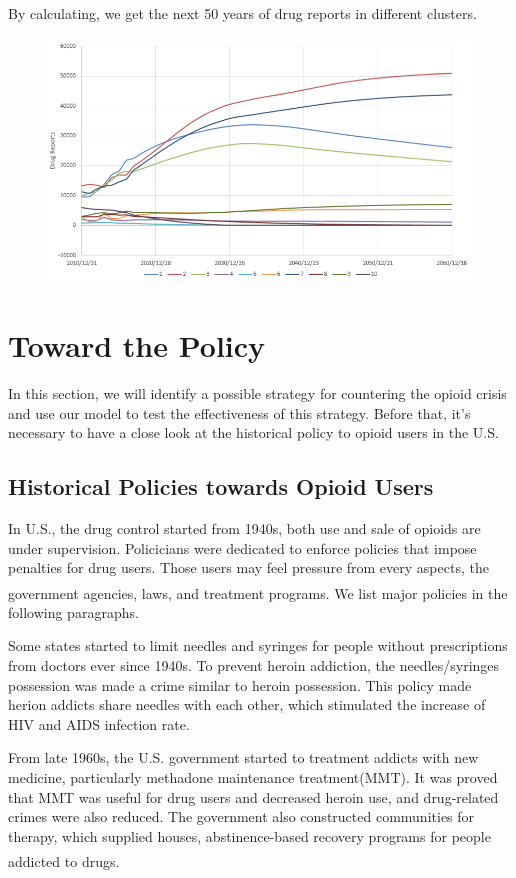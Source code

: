 \documentclass[12pt]{article}
\newcommand{\upcite}[1]{\textsuperscript{\textsuperscript{\cite{#1}}}}
\begin{document}
By calculating, we get the next 50 years of drug reports in different clusters. 
\begin{figure}[H]
	\centering
	\includegraphics[scale=0.8]{./figures/12.png}
	\caption{}
	\label{Fig12}
\end{figure}

\section{Toward the Policy}
In this section, we will identify a possible strategy for countering the opioid crisis and use our model to test the effectiveness of this strategy. Before that, it’s necessary to have a close look at the historical policy to opioid users in the U.S.

\subsection{Historical Policies towards Opioid Users} %
In U.S., the drug control started from 1940s, both use and sale of opioids are under supervision. Policicians were dedicated to enforce policies that impose penalties for drug users. Those users may feel pressure from every aspects, the government agencies, laws, and treatment programs\upcite{5}. We list major policies in the following paragraphs.

Some states started to limit needles and syringes for people without prescriptions from doctors ever since 1940s. To prevent heroin addiction, the needles/syringes possession was made a crime similar to heroin possession. This policy made herion addicts share needles with each other, which stimulated the increase of HIV and AIDS infection rate.

From late 1960s, the U.S. government started to treatment addicts with new medicine, particularly methadone maintenance treatment(MMT). It was proved that MMT was useful for drug users and decreased heroin use, and drug-related crimes were also reduced. The government also constructed communities for therapy, which supplied houses, abstinence-based recovery programs for people addicted to drugs\upcite{4}.
\end{document}
